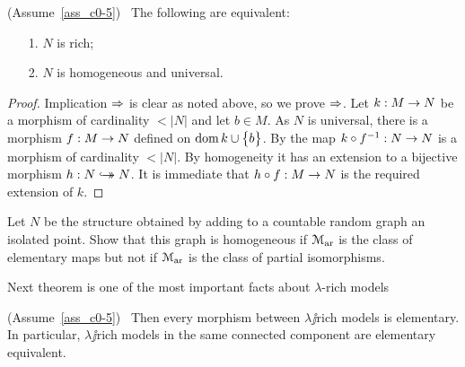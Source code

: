 \documentclass[creche.tex]{subfiles}
\begin{document}
\begin{theorem}\label{ricco<->universaleomogeneo}
(Assume~\ref{ass_c0-5}) \ The following are equivalent:
\begin{itemize}
\item[1.] $N$ is rich;
\item[2.] $N$ is homogeneous and universal.
\end{itemize}
\end{theorem}
\begin{proof} 
Implication $\Rightarrow$ is clear as noted above, so we prove $\Rightarrow$. Let $k:M\rightarrow N$ be a morphism of cardinality $<|N|$ and let $b\in M$. As $N$ is universal, there is a morphism \hbox{$f:M\rightarrow N$} defined on $\mathop{\rm dom} k\cup\big\{b\big\}$. By  the map $k\circ f^{-1}:N\rightarrow N$ is a morphism of cardinality $<|N|$. By homogeneity it has an extension to a bijective morphism $h:N\hookrightarrow\mathrel{\mspace{-15mu}}\rightarrow N$. It is immediate that $h\circ f:M\rightarrow N$ is the required extension of $k$.
\end{proof}


\begin{exercise}
Let $N$ be the structure obtained by adding to a countable random graph an isolated point. Show that this graph is homogeneous if $\EuScript M_{\rm ar}$ is the class of elementary maps but not if $\EuScript M_{\rm ar}$ is the class of partial isomorphisms.\QED
\end{exercise}

Next theorem is one of the most important facts about $\lambda$-rich models

\begin{theorem}\label{thm_morphism_rich_elementary}
(Assume~\ref{ass_c0-5})  \  Then every morphism between $\lambda\jj$rich models is elementary. In particular, $\lambda\jj$rich models in the same connected component are elementary equivalent.
\end{theorem}
\end{document}
